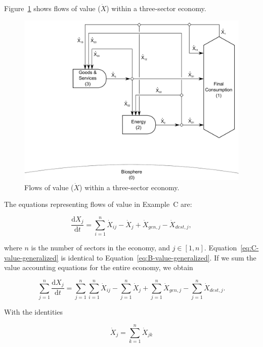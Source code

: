 Figure~\ref{fig:C_value} shows flows of value ($\dot{X}$) 
within a three-sector economy. 

\begin{figure}[!ht]
\centering
\includegraphics[width=0.8\linewidth]{Part_2/Chapter_Values/images/3_sector_value.pdf}
\caption[Flows of value within a three-sector economy.]{Flows of value ($\dot{X}$) within a three-sector economy.}
\label{fig:C_value}
\end{figure}

The equations representing flows of value in Example~C are:

\begin{equation}\label{eq:C-value-generalized}
	\frac{\mathrm{d}X_{j}}{\mathrm{d}t}
	= \sum\limits_{i=1}^{n} \dot{X}_{ij}
	- \dot{X}_{j}
	+ \dot{X}_{gen,j}
	- \dot{X}_{dest,j},
\end{equation}

\noindent{}where $n$ is the number of sectors in the economy, and $j \in [1, n]$.
Equation~\ref{eq:C-value-generalized} is identical to Equation~\ref{eq:B-value-generalized}.
If we sum the value accounting equations for the entire economy, 
we obtain

\begin{equation}\label{eq:C-value-economy-a}
	\sum\limits_{j=1}^{n} \frac{\mathrm{d}X_{j}}{\mathrm{d}t}
	= \sum\limits_{j=1}^{n} \sum\limits_{i=1}^{n} \dot{X}_{ij}
	- \sum\limits_{j=1}^{n} \dot{X}_{j}
	+ \sum\limits_{j=1}^{n} \dot{X}_{gen,j}
	- \sum\limits_{j=1}^{n} \dot{X}_{dest,j}.
\end{equation}

\noindent{}With the identities

\begin{equation} \label{eq:X_identity_1}
	\dot{X}_{j}  
	= \sum\limits_{k=1}^n \dot{X}_{jk}
\end{equation}

